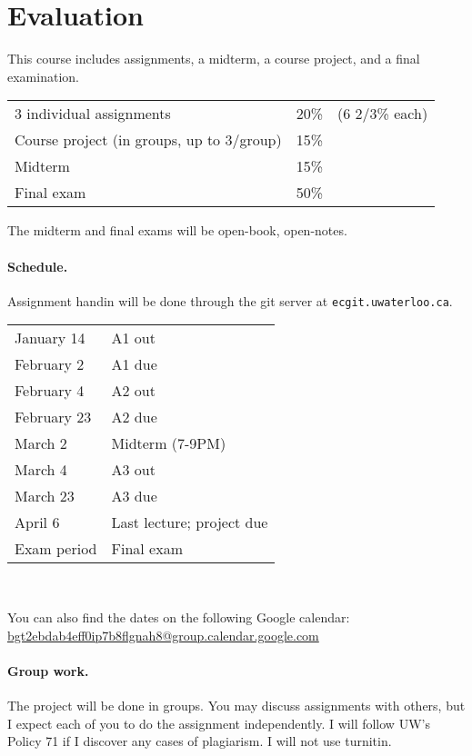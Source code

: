 \documentclass{article}
\begin{document}
\section*{Evaluation}
This course includes assignments, a midterm, a course project, and a final
examination.

\begin{tabular}{lrl}
3 individual assignments & 20\% & (6 2/3\% each) \\
Course project (in groups, up to 3/group) & 15\% \\
Midterm & 15\% \\
Final exam & 50\% \\
\end{tabular}

\noindent The midterm and final exams will be open-book, open-notes. 

\paragraph{Schedule.} Assignment handin will be done through the git server at {\tt ecgit.uwaterloo.ca}.\\[-1em]
\begin{center}
\begin{tabular}{ll}
January 14	&A1 out\\
February 2	&A1 due\\
February 4  &A2 out\\
February 23	&A2 due\\
March 2 	&Midterm (7-9PM)\\
March 4     &A3 out\\
March 23	&A3 due\\
April 6 	&Last lecture; project due\\
Exam period	&Final exam
\end{tabular}~\\
\end{center}
You can also find the dates on the following Google calendar:\\
\hspace*{3em}\url{bgt2ebdab4eff0ip7b8flgnah8@group.calendar.google.com}

\paragraph{Group work.} The project will be done in groups.
You may discuss assignments with others, but I expect each of
you to do the assignment independently. I will follow UW's Policy 71
if I discover any cases of plagiarism. I will not use turnitin.
\end{document}
